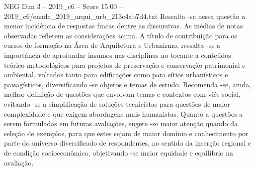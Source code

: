 \begin{textsample}{NEG Dim 3 – 2019\_c6 – Score 15.00 – 2019\_c6/enade\_2019\_arqui\_urb\_213c4ab7d4.txt}
Ressalta -se nessa questão a menor incidência de respostas fracas dentre as discursivas.
As médias de notas observadas refletem as considerações acima.
A título de contribuição para os cursos de formação na Área de Arquitetura e Urbanismo, ressalta -se a importância de aprofundar insumos nas disciplinas no tocante a conteúdos teórico-metodológicos para projetos de preservação e conservação patrimonial e ambiental, voltados tanto para edificações como para sítios urbanísticos e paisagísticos, diversificando -se objetos e temas de estudo.
Recomenda -se, ainda, melhor definição de questões que envolvam temas e contextos com viés social, evitando -se a simplificação de soluções tecnicistas para questões de maior complexidade e que exigem abordagens mais humanistas.
Quanto a questões a serem formuladas em futuras avaliações, sugere -se maior atenção quando da seleção de exemplos, para que estes sejam de maior domínio e conhecimento por parte do universo diversificado de respondentes, no sentido da inserção regional e de condição socioeconômica, objetivando -se maior equidade e equilíbrio na avaliação.

\end{textsample}
